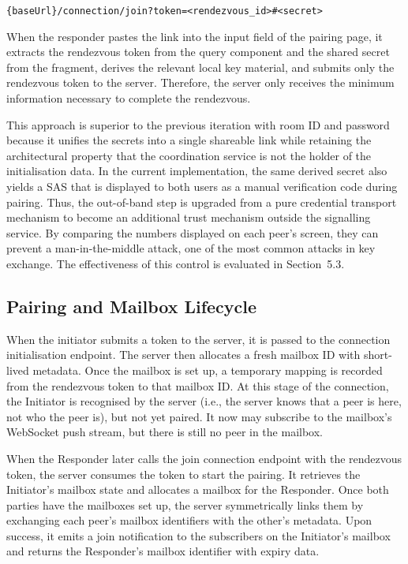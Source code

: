 \documentclass[12pt,a4paper,oneside]{report}
\begin{document}
\begin{center}
  \texttt{\{baseUrl\}/connection/join?token=<rendezvous\_id>\#<secret>}
\end{center}

\noindent When the responder pastes the link into the input field of the pairing page, it extracts the rendezvous token from the query component and the shared secret from the fragment, derives the relevant local key material, and submits only the rendezvous token to the server. Therefore, the server only receives the minimum information necessary to complete the rendezvous.

This approach is superior to the previous iteration with room ID and password because it unifies the secrets into a single shareable link while retaining the architectural property that the coordination service is not the holder of the initialisation data. In the current implementation, the same derived secret also yields a SAS that is displayed to both users as a manual verification code during pairing. Thus, the out-of-band step is upgraded from a pure credential transport mechanism to become an additional trust mechanism outside the signalling service. By comparing the numbers displayed on each peer's screen, they can prevent a man-in-the-middle attack, one of the most common attacks in key exchange. The effectiveness of this control is evaluated in Section~5.3.


\subsection{Pairing and Mailbox Lifecycle}
\label{sec:pairing-mailbox}

When the initiator submits a token to the server, it is passed to the connection initialisation endpoint. The server then allocates a fresh mailbox ID with short-lived metadata. Once the mailbox is set up, a temporary mapping is recorded from the rendezvous token to that mailbox ID. At this stage of the connection, the Initiator is recognised by the server (i.e., the server knows that a peer is here, not who the peer is), but not yet paired. It now may subscribe to the mailbox's WebSocket push stream, but there is still no peer in the mailbox.

When the Responder later calls the join connection endpoint with the rendezvous token, the server consumes the token to start the pairing. It retrieves the Initiator's mailbox state and allocates a mailbox for the Responder. Once both parties have the mailboxes set up, the server symmetrically links them by exchanging each peer's mailbox identifiers with the other's metadata. Upon success, it emits a join notification to the subscribers on the Initiator's mailbox and returns the Responder's mailbox identifier with expiry data.
\end{document}
